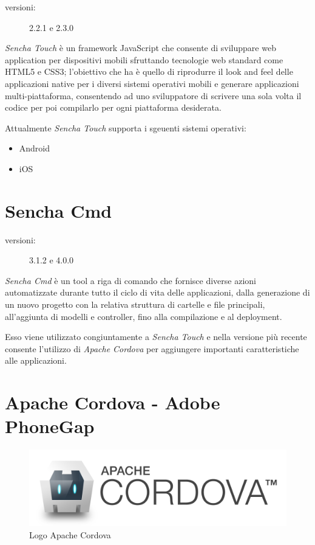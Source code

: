 \begin{description}
\item[versioni:] 2.2.1 e 2.3.0
\end{description}

\emph{Sencha Touch} è un framework JavaScript che consente di sviluppare web application per dispositivi mobili sfruttando tecnologie web standard come \acs{HTML5} e \acs{CSS3}; l'obiettivo che ha è quello di riprodurre il look and feel delle applicazioni native per i diversi sistemi operativi mobili e generare applicazioni multi-piattaforma, consentendo ad uno sviluppatore di scrivere una sola volta il codice per poi compilarlo per ogni piattaforma desiderata.

Attualmente \emph{Sencha Touch} supporta i sgeuenti sistemi operativi:
\begin{itemize}
\item Android
\item iOS
\end{itemize}

\section{Sencha Cmd}
\begin{description}
\item[versioni:] 3.1.2 e 4.0.0
\end{description}

\emph{Sencha Cmd} è un tool a riga di comando che fornisce diverse azioni automatizzate durante tutto il ciclo di vita delle applicazioni, dalla generazione di un nuovo progetto con la relativa struttura di cartelle e file principali, all'aggiunta di modelli e controller, fino alla compilazione e al deployment.

Esso viene utilizzato congiuntamente a \emph{Sencha Touch} e nella versione più recente consente l'utilizzo di \emph{Apache Cordova} per aggiungere importanti caratteristiche alle applicazioni.
 
\section{Apache Cordova - Adobe PhoneGap}
\begin{figure}[htb]
\centering
\includegraphics[scale=0.15]{gfx/cordova_logo_normal_dark}
\caption{Logo Apache Cordova}
\label{fig: logo cordova}
\end{figure}

